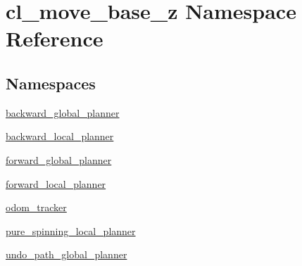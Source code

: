 \hypertarget{namespacecl__move__base__z}{}\section{cl\+\_\+move\+\_\+base\+\_\+z Namespace Reference}
\label{namespacecl__move__base__z}
\subsection*{Namespaces}
\begin{DoxyCompactItemize}
\item 
 \hyperlink{namespacecl__move__base__z_1_1backward__global__planner}{backward\+\_\+global\+\_\+planner}
\item 
 \hyperlink{namespacecl__move__base__z_1_1backward__local__planner}{backward\+\_\+local\+\_\+planner}
\item 
 \hyperlink{namespacecl__move__base__z_1_1forward__global__planner}{forward\+\_\+global\+\_\+planner}
\item 
 \hyperlink{namespacecl__move__base__z_1_1forward__local__planner}{forward\+\_\+local\+\_\+planner}
\item 
 \hyperlink{namespacecl__move__base__z_1_1odom__tracker}{odom\+\_\+tracker}
\item 
 \hyperlink{namespacecl__move__base__z_1_1pure__spinning__local__planner}{pure\+\_\+spinning\+\_\+local\+\_\+planner}
\item 
 \hyperlink{namespacecl__move__base__z_1_1undo__path__global__planner}{undo\+\_\+path\+\_\+global\+\_\+planner}
\end{DoxyCompactItemize}
